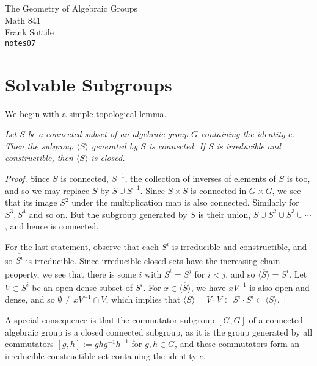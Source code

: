 \documentclass[12pt]{amsart}
\def\silentfootnote#1{{\let\thefootnote\relax\footnotetext{#1}}}
\begin{document}
\begin{center}
\Large
The Geometry of Algebraic Groups\\
\large
Math 841\\
Frank Sottile\\
{\tt notes07}
\end{center}\bigskip

\silentfootnote{\sl Version of 2 April 2000} 


\section{Solvable Subgroups}

We begin with a simple topological lemma.
\medskip

{\it
Let $S$ be a connected subset of an algebraic group $G$ containing
the identity $e$.
Then the subgroup $\langle S \rangle$ generated by $S$ is connected.
If $S$ is irreducible and constructible, then $\langle S \rangle$ is closed.
}\medskip

\begin{proof}
Since $S$ is connected, $S^{-1}$, the collection of inverses of elements of
$S$ is too, and so we may replace $S$ by $S\cup S^{-1}$.
Since $S\times S$ is connected in $G\times G$, we see that its image
$S^2$ under the multiplication map is also connected.
Similarly for $S^3, S^4$ and so on.
But the subgroup generated by $S$ is their union, 
$S\cup S^2\cup S^3\cup\cdots$, and hence is connected.

For the last statement, observe that each $S^i$ is irreducible and
constructible, and so $\overline{S^i}$ is irreducible.
Since irreducible closed sets have the increasing chain peoperty, we see
that there is some $i$ with $\overline{S^i}=\overline{S^j}$ for $i<j$, and
so $\overline{\langle S \rangle}=\overline{S^i}$.
Let $V\subset S^i$ be an open dense subset of $\overline{S^i}$.
For $x\in \overline{\langle S \rangle}$, we have $x V^{-1}$ is also open and
dense, and so $\emptyset \neq x V^{-1}\cap V$, which implies that 
$\overline{\langle S \rangle}=V\cdot V\subset S^i\cdot S^i\subset 
\langle S \rangle$.
\end{proof}


A special consequence is that the commutator subgroup 
$[G,G]$ of a connected algebraic group is a closed connected subgroup, as it
is the group generated by all commutators  
$[g,h]:=ghg^{-1}h^{-1}$ for $g,h\in G$, and these commutators form an
irreducible constructible set containing the identity $e$.
\bigskip
\end{document}
